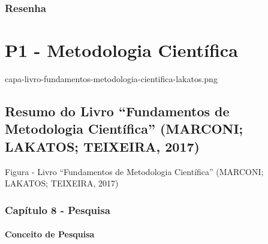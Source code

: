 \documentclass[
]{book}
\begin{document}
\hypertarget{resenha-1}{%
\subsection{Resenha}\label{resenha-1}}

\hypertarget{p1---metodologia-cientuxedfica}{%
\chapter{P1 - Metodologia Científica}\label{p1---metodologia-cientuxedfica}}

capa-livro-fundamentos-metodologia-cientifica-lakatos.png

\hypertarget{resumo-do-livro-fundamentos-de-metodologia-cientuxedfica-marconi-lakatos-teixeira-2017}{%
\section{\texorpdfstring{Resumo do Livro ``\textbf{Fundamentos de Metodologia Científica}'' (MARCONI; LAKATOS; TEIXEIRA, 2017)}{Resumo do Livro ``Fundamentos de Metodologia Científica'' (MARCONI; LAKATOS; TEIXEIRA, 2017)}}\label{resumo-do-livro-fundamentos-de-metodologia-cientuxedfica-marconi-lakatos-teixeira-2017}}

Figura - Livro ``Fundamentos de Metodologia Científica'' (MARCONI; LAKATOS; TEIXEIRA, 2017)

\hypertarget{capuxedtulo-8---pesquisa}{%
\subsection{Capítulo 8 - Pesquisa}\label{capuxedtulo-8---pesquisa}}

\hypertarget{conceito-de-pesquisa}{%
\subsubsection{Conceito de Pesquisa}\label{conceito-de-pesquisa}}
\end{document}
